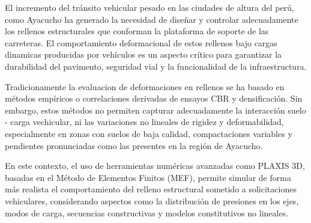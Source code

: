 


El incremento del tránsito vehicular pesado en las ciudades de altura del perú, como Ayacucho ha generado la necesidad de diseñar y controlar adecuadamente los rellenos estructurales que conforman la plataforma de soporte de las carreteras. El comportamiento deformacional de estos rellenos bajo cargas dinamicas producidas por vehículos es un aspecto crítico para garantizar la durabilidad del pavimento, seguridad vial y la funcionalidad de la infraestructura.

Tradicionamente la evaluacion de deformaciones en rellenos se ha basado en métodos empíricos o correlaciones derivadas de ensayos CBR y densificación. Sin embargo, estos métodos no permiten capturar adecuadamente la interacción suelo - carga vechicular, ni las variaciones no lineales de rigidez y deformabilidad, especialmente en zonas con suelos de baja calidad, compactaciones variables y pendientes pronunciadas como las presentes en la región de Ayacucho.

En este contexto, el uso de herramientas numéricas avanzadas como PLAXIS 3D, basadas en el Método de Elementos Finitos (MEF), permite simular de forma más realista el comportamiento del relleno estructural sometido a solicitaciones vehiculares, considerando aspectos como la distribución de presiones en los ejes, modos de carga, secuencias constructivas y modelos constitutivos no lineales.


